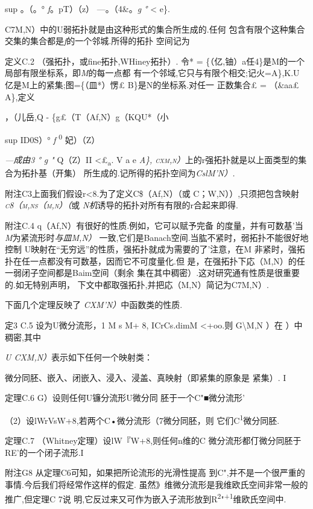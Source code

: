 sup \textbar{}\textbar{}。（。° \emph{f}。pT）（z） ---。（4\&。\emph{g
°} \textless{} e\}.

C7M,N）中的U弱拓扑就是由这种形式的集合所生成的.任何
包含有限个这种集合交集的集合都是\emph{f}的一个邻城.所得的拓扑 空间记为

定义C.2 （强拓扑，或fine拓扑,WHiney拓扑）. 令* =
\{（亿,铀）\textbar{}a任4\}是M的一个局部有限坐标系，即\emph{M}的每一点都
有一个邻域,它只与有限个相交;记火=A\},K.U 亿是M上的紧集;图=\{（皿*）愣£
B\}是N的坐标系.对任一 正数集合£ = （\&a\textbar{}a£ A\},定义

，（儿岳,Q - \{g£（T（Af,N）\textbar{}g（KQU*（小

sup ID0S）° \emph{f} \textsuperscript{0} 妃）（Z）

\emph{---成由3 ° g "} Q（Z）II \textless{}£\textsubscript{a}. V a e
\emph{A\},
\textsc{cxm,n）}}上的r强拓扑就是以上面类型的集合为拓扑基（开集）
所生成的.记所得的拓扑空间为\emph{CslM'N）.}

附注C3上面我们假设r\textless{}8.为了定义C\$（Af,N）（或
C；W,N））,只须把包含映射 \emph{\textsc{c8（m,ns（m,n）（}}或
\emph{N机}诱导的拓扑对所有有限的r合起来即得.

附注C.4 q（Af,N）有很好的性质.例如，它可以赋予完备
的度量，并有可数基'当\emph{M}为紧流形时\emph{与皿M,N）}
一致,它们是Banach空间.当肱不紧时，弱拓扑不能很好地控制
U映射在``无穷远''的性质，强拓扑就成为需要的了'注意，在M
非紧时，强拓扑在任一点都没有可数基，因而它不可度量化.但
是，在强拓扑下応（M,N）的任一弱闭子空间都是Baim空间（剩余
集在其中稠密）.这对研究通有性质是很重要的.如无特别声明，
下文中都取强拓扑,并把応（M,N）简记为C7M,N）.

下面几个定理反映了 \emph{CXM'N）}中函数类的性质.

定3 C.5 设为U微分流形，1 M s M+ 8, ICrCs.dimM \textless{}+oo.则
G\textbackslash{}M,N ）在 ）中稠密,其中

\emph{U CXM,N）}表示如下任何一个映射类：

微分同胚、嵌入、闭嵌入、浸入、浸盖、真映射（即紧集的原象是 紧集）. I

定理C.6 G）设则任何U镰分流形U微分同 胚于一个C"■微分流形'

（2）设lWrVsW+8,若两个C•微分流形（7微分同胚，则
它们C\textsuperscript{1}微分同胚.\textbar{}

定理C.7 （Whitney定理）设lW『W+8,则任何n维的C
微分流形都仃微分同胚于RE'的一个闭子流形.I

附注G8 从定理C6可知，如果把所论流形的光滑性提高
到C",并不是一个很严重的事情.今后我们将经常作这样的假定.
虽然》维微分流形是我维欧氏空间非常一般的推广,但定理C 7说
明,它反过来又可作为嵌入子流形放到R\textsuperscript{2}"\textsuperscript{+1}维欧氏空间中.

